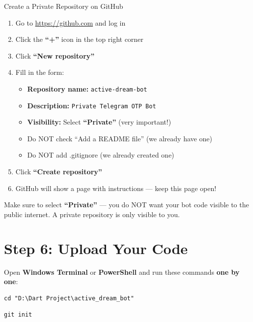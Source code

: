\begin{stepbox}{Create a Private Repository on GitHub}
\begin{enumerate}[leftmargin=1.5cm]
    \item Go to \url{https://github.com} and log in
    \item Click the \textbf{``+''} icon in the top right corner
    \item Click \textbf{``New repository''}
    \item Fill in the form:
    \begin{itemize}
        \item \textbf{Repository name:} \texttt{active-dream-bot}
        \item \textbf{Description:} \texttt{Private Telegram OTP Bot}
        \item \textbf{Visibility:} Select \textbf{``Private''} (very important!)
        \item Do NOT check ``Add a README file'' (we already have one)
        \item Do NOT add .gitignore (we already created one)
    \end{itemize}
    \item Click \textbf{``Create repository''}
    \item GitHub will show a page with instructions --- keep this page open!
\end{enumerate}
\end{stepbox}

\begin{importantbox}
Make sure to select \textbf{``Private''} --- you do NOT want your bot code visible to the public internet. A private repository is only visible to you.
\end{importantbox}

\section{Step 6: Upload Your Code}

Open \textbf{Windows Terminal} or \textbf{PowerShell} and run these commands \textbf{one by one}:

\begin{lstlisting}[style=termstyle, title={Step 6.1: Go to your project folder}]
cd "D:\Dart Project\active_dream_bot"
\end{lstlisting}

\begin{lstlisting}[style=termstyle, title={Step 6.2: Initialize Git}]
git init
\end{lstlisting}

